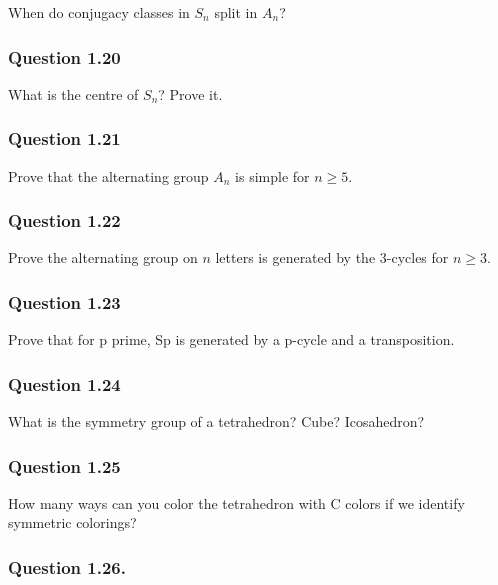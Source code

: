 When do conjugacy classes in \(S_n\) split in \(A_n\)?

\hypertarget{question-1.20}{%
\subsubsection{Question 1.20}\label{question-1.20}}

What is the centre of \(S_n\)? Prove it.

\hypertarget{question-1.21}{%
\subsubsection{Question 1.21}\label{question-1.21}}

Prove that the alternating group \(A_n\) is simple for \(n \geq 5\).

\hypertarget{question-1.22}{%
\subsubsection{Question 1.22}\label{question-1.22}}

Prove the alternating group on \(n\) letters is generated by the
3-cycles for \(n \geq 3\).

\hypertarget{question-1.23}{%
\subsubsection{Question 1.23}\label{question-1.23}}

Prove that for p prime, Sp is generated by a p-cycle and a
transposition.

\hypertarget{question-1.24}{%
\subsubsection{Question 1.24}\label{question-1.24}}

What is the symmetry group of a tetrahedron? Cube? Icosahedron?

\hypertarget{question-1.25}{%
\subsubsection{Question 1.25}\label{question-1.25}}

How many ways can you color the tetrahedron with C colors if we identify
symmetric colorings?

\hypertarget{question-1.26.}{%
\subsubsection{Question 1.26.}\label{question-1.26.}}

